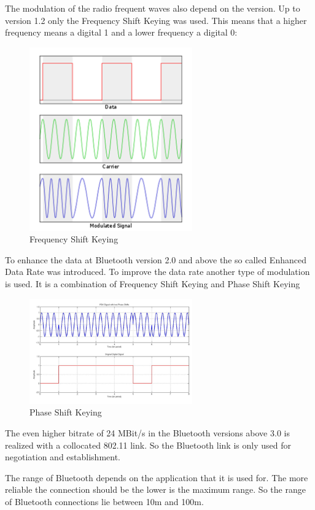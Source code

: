 \documentclass[11pt]{article}
\begin{document}
The modulation of the radio frequent waves also depend on the version. Up to version 1.2 only the Frequency Shift Keying was used. This means that a higher frequency means a digital 1 and a lower frequency a digital 0:

 
\begin{figure}[H]

 \centering
 \includegraphics [width=7cm]{fsk.png} 
 \caption{Frequency Shift Keying\cite{cite11}}
\end{figure}

To enhance the data at Bluetooth version 2.0 and above the so called Enhanced Data Rate was introduced. To improve the data rate another type of modulation is used. It is a combination of Frequency Shift Keying and Phase Shift Keying

\begin{figure}[H]

 \centering
 \includegraphics [width=7cm]{psk.png} 
 \caption{Phase Shift Keying\cite{cite12}}
\end{figure}

The even higher bitrate of 24 MBit/s in the Bluetooth versions above 3.0 is realized with a collocated 802.11 link. So the Bluetooth link is only used for negotiation and establishment.

The range of Bluetooth depends on the application that it is used for. The more reliable the connection should be the lower is the maximum range. So the range of Bluetooth connections lie between 10m and 100m.
\end{document}
